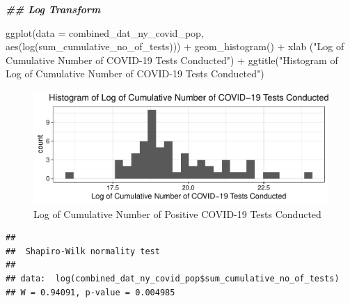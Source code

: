\documentclass[
  12pt,
]{article}
\newenvironment{Shaded}{\begin{snugshade}}{\end{snugshade}}
\newcommand{\AttributeTok}[1]{\textcolor[rgb]{0.77,0.63,0.00}{#1}}
\newcommand{\DocumentationTok}[1]{\textcolor[rgb]{0.56,0.35,0.01}{\textbf{\textit{#1}}}}
\newcommand{\FunctionTok}[1]{\textcolor[rgb]{0.00,0.00,0.00}{#1}}
\newcommand{\NormalTok}[1]{#1}
\newcommand{\SpecialCharTok}[1]{\textcolor[rgb]{0.00,0.00,0.00}{#1}}
\newcommand{\StringTok}[1]{\textcolor[rgb]{0.31,0.60,0.02}{#1}}
\begin{document}
\begin{Shaded}
\begin{Highlighting}[]
\DocumentationTok{\#\# Log Transform}

\FunctionTok{ggplot}\NormalTok{(}\AttributeTok{data =}\NormalTok{ combined\_dat\_ny\_covid\_pop, }\FunctionTok{aes}\NormalTok{(}\FunctionTok{log}\NormalTok{(sum\_cumulative\_no\_of\_tests))) }\SpecialCharTok{+}
  \FunctionTok{geom\_histogram}\NormalTok{() }\SpecialCharTok{+}
  \FunctionTok{xlab}\NormalTok{ (}\StringTok{"Log of Cumulative Number of COVID{-}19 Tests Conducted"}\NormalTok{) }\SpecialCharTok{+}
  \FunctionTok{ggtitle}\NormalTok{(}\StringTok{"Histogram of Log of Cumulative Number of COVID{-}19 Tests Conducted"}\NormalTok{)}
\end{Highlighting}
\end{Shaded}

\begin{figure}

{\centering \includegraphics{EDA_Final_Group_Project_files/figure-latex/unnamed-chunk-7-1} 

}

\caption{Log of Cumulative Number of Positive COVID-19 Tests Conducted}\label{fig:unnamed-chunk-7}
\end{figure}

\begin{Shaded}
\end{Shaded}

\begin{verbatim}
## 
##  Shapiro-Wilk normality test
## 
## data:  log(combined_dat_ny_covid_pop$sum_cumulative_no_of_tests)
## W = 0.94091, p-value = 0.004985
\end{verbatim}
\end{document}
